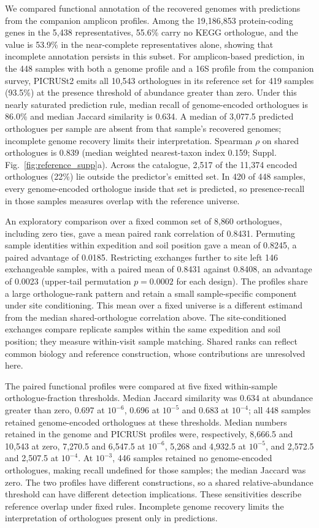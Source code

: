 We compared functional annotation of the recovered genomes with predictions from the companion amplicon profiles. Among the 19{,}186{,}853 protein-coding genes in the 5{,}438 representatives, 55.6\% carry
no KEGG orthologue, and the value is 53.9\% in the near-complete representatives alone, showing that incomplete annotation persists in this subset. For amplicon-based prediction, in the 448
samples with both a genome profile and a 16S profile from the companion survey, PICRUSt2
emits all 10{,}543 orthologues in its reference set for 419 samples (93.5\%) at the presence
threshold of abundance greater than zero. Under this nearly saturated prediction rule,
median recall of genome-encoded orthologues is 86.0\% and median Jaccard similarity is 0.634.
A median of 3{,}077.5 predicted orthologues per sample are absent from that sample's recovered
genomes; incomplete genome recovery limits their interpretation. Spearman $\rho$ on shared
orthologues is 0.839 (median weighted nearest-taxon index 0.159; Suppl. Fig.~\ref{fig:reference_supp}a).
Across the catalogue, 2{,}517 of the 11{,}374 encoded orthologues (22\%) lie outside the predictor's
emitted set. In 420 of 448 samples, every genome-encoded orthologue inside that set is predicted,
so presence-recall in those samples measures overlap with the reference universe.




An exploratory comparison over a fixed common set of 8{,}860 orthologues, including zero ties, gave a mean paired rank correlation of 0.8431. Permuting sample identities within expedition and soil position gave a mean of 0.8245, a paired advantage of 0.0185. Restricting exchanges further to site left 146 exchangeable samples, with a paired mean of 0.8431 against 0.8408, an advantage of 0.0023 (upper-tail permutation $p = 0.0002$ for each design). The profiles share a large orthologue-rank pattern and retain a small sample-specific component under site conditioning. This mean over a fixed universe is a different estimand from the median shared-orthologue correlation above. The site-conditioned exchanges compare replicate samples within the same expedition and soil position; they measure within-visit sample matching. Shared ranks can reflect common biology and reference construction, whose contributions are unresolved here.

The paired functional profiles were compared at five fixed within-sample orthologue-fraction thresholds. Median Jaccard similarity was 0.634 at abundance greater than zero, 0.697 at $10^{-6}$, 0.696 at $10^{-5}$ and 0.683 at $10^{-4}$; all 448 samples retained genome-encoded orthologues at these thresholds. Median numbers retained in the genome and PICRUSt profiles were, respectively, 8{,}666.5 and 10{,}543 at zero, 7{,}270.5 and 6{,}547.5 at $10^{-6}$, 5{,}268 and 4{,}932.5 at $10^{-5}$, and 2{,}572.5 and 2{,}507.5 at $10^{-4}$. At $10^{-3}$, 446 samples retained no genome-encoded orthologues, making recall undefined for those samples; the median Jaccard was zero. The two profiles have different constructions, so a shared relative-abundance threshold can have different detection implications. These sensitivities describe reference overlap under fixed rules. Incomplete genome recovery limits the interpretation of orthologues present only in predictions.

